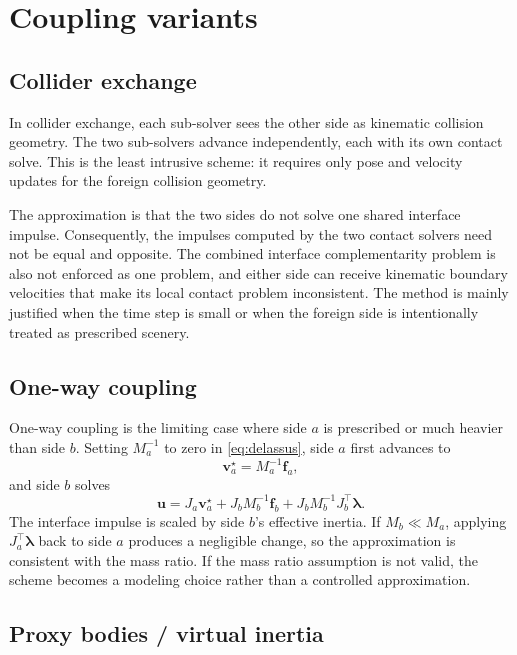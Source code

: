 \documentclass[11pt]{article}
\newcommand{\va}{\bm v_a}
\newcommand{\uu}{\bm u}
\newcommand{\fa}{\bm f_a}
\newcommand{\fb}{\bm f_b}
\newcommand{\lam}{\bm\lambda}
\newcommand{\Ja}{J_a}
\newcommand{\Jb}{J_b}
\newcommand{\Ma}{M_a}
\newcommand{\Mb}{M_b}
\begin{document}
\section{Coupling variants}

\subsection{Collider exchange}

In collider exchange, each sub-solver sees the other side as kinematic collision
geometry. The two sub-solvers advance independently, each with its own contact solve.
This is the least intrusive scheme: it requires only pose and velocity updates for the
foreign collision geometry.

The approximation is that the two sides do not solve one shared interface impulse.
Consequently, the impulses computed by the two contact solvers need not be equal and
opposite. The combined interface complementarity problem is also not enforced as one
problem, and either side can receive kinematic boundary velocities that make its local
contact problem inconsistent. The method is mainly justified when the time step is
small or when the foreign side is intentionally treated as prescribed scenery.

\subsection{One-way coupling}

One-way coupling is the limiting case where side $a$ is prescribed or much heavier than
side $b$. Setting $\Ma^{-1}$ to zero in \eqref{eq:delassus}, side $a$ first advances to
\[
    \va^\star=\Ma^{-1}\fa ,
\]
and side $b$ solves
\begin{equation}
    \uu =
      \Ja\va^\star
    + \Jb\Mb^{-1}\fb
    + \Jb\Mb^{-1}\Jb^\top\lam .
    \label{eq:one-way}
\end{equation}
The interface impulse is scaled by side $b$'s effective inertia. If
$\Mb \ll \Ma$, applying $\Ja^\top\lam$ back to side $a$ produces a negligible change,
so the approximation is consistent with the mass ratio. If the mass ratio assumption is
not valid, the scheme becomes a modeling choice rather than a controlled
approximation.

\subsection{Proxy bodies / virtual inertia}
\end{document}
